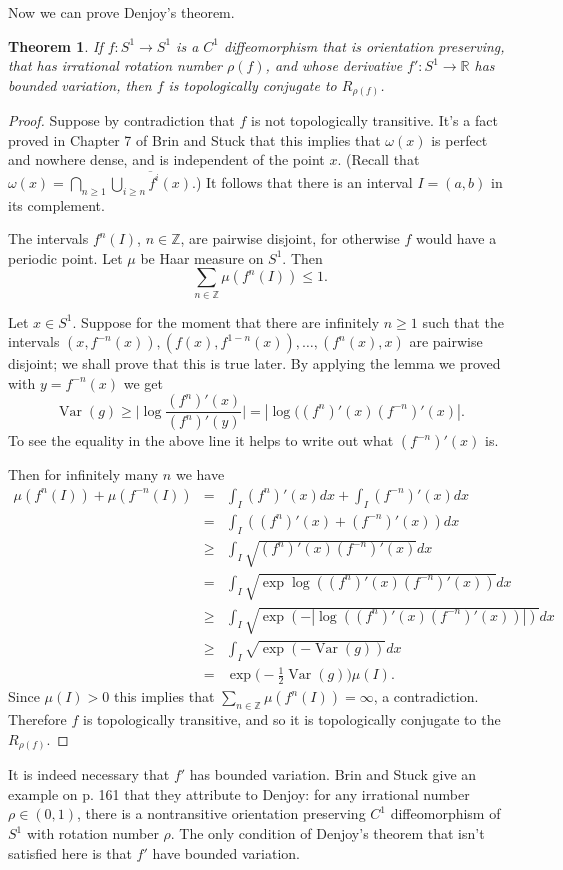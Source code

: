 \documentclass{article}
\newtheorem{theorem}{Theorem}
\newcommand{\Var}[0]{\operatorname{Var}}
\begin{document}
Now we can prove Denjoy's theorem.

\begin{theorem}
If $f:S^1 \to S^1$ is a $C^1$ diffeomorphism that is orientation preserving, that has irrational rotation
number $\rho(f)$, and whose derivative $f':S^1 \to \mathbb{R}$ has bounded variation, then $f$ is topologically
conjugate to $R_{\rho(f)}$.
\end{theorem}
\begin{proof}
Suppose by contradiction that $f$ is not topologically transitive. It's a fact proved in Chapter 7
of Brin and Stuck that this implies that $\omega(x)$ is perfect and nowhere dense, and is independent
of the point $x$. (Recall that $\omega(x)=\bigcap_{n \geq 1} \overline{\bigcup_{i \geq n} f^i(x)}$.)
It follows that
 there is an interval $I=(a,b)$
in its complement.

The intervals $f^n(I)$, $n \in \mathbb{Z}$, are pairwise disjoint, for otherwise
$f$ would have a periodic point. Let $\mu$ be Haar measure on $S^1$. Then
\[
\sum_{n \in \mathbb{Z}} \mu(f^n(I)) \leq 1.
\]

Let $x \in S^1$. Suppose for the moment that there are infinitely $n \geq 1$ such that
the intervals $(x,f^{-n}(x)), (f(x),f^{1-n}(x)),\ldots, (f^n(x),x)$ are pairwise disjoint;
we shall prove that this is true later.
By applying the lemma we proved with
$y=f^{-n}(x)$ we get 
\[
\Var(g) \geq \Big| \log \frac{(f^n)'(x)}{(f^n)'(y)} \Big|=
|\log((f^n)'(x) (f^{-n})'(x)|. 
\]
To see the equality in the above line it helps to write out what $(f^{-n})'(x)$ is.

Then for infinitely many $n$ we have
\begin{eqnarray*}
\mu(f^n(I))+\mu(f^{-n}(I))&=&\int_I (f^n)'(x) dx +\int_I (f^{-n})'(x) dx\\
&=&\int_I ((f^n)'(x)+(f^{-n})'(x)) dx\\
&\geq&\int_I \sqrt{(f^n)'(x) (f^{-n})'(x)}dx\\
&=&\int_I \sqrt{\exp \log((f^n)'(x) (f^{-n})'(x))} dx\\
&\geq&\int_I \sqrt{\exp(-| \log((f^n)'(x) (f^{-n})'(x)) |)} dx\\
&\geq&\int_I \sqrt{\exp(-\Var(g))} dx\\
&=&\exp\Big( -\frac{1}{2}\Var(g) \Big) \mu(I).
\end{eqnarray*}
Since $\mu(I)>0$ this implies that $\sum_{n \in \mathbb{Z}} \mu(f^n(I))=\infty$, a contradiction. Therefore
$f$ is topologically transitive, and so it is topologically conjugate
to the $R_{\rho(f)}$.
\end{proof}

It is indeed necessary that $f'$ has bounded variation. Brin and Stuck give an example on p. 161 that they attribute to Denjoy: for any irrational number $\rho \in (0,1)$, there is a nontransitive orientation preserving $C^1$
diffeomorphism of $S^1$ with rotation number $\rho$. The only condition of Denjoy's theorem that isn't
satisfied here is that $f'$ have bounded variation.
\end{document}

